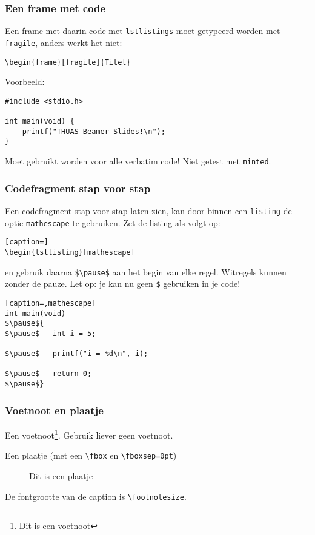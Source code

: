 \documentclass[fleqn,aspectratio=169,dutch,10pt]{beamer}
\begin{document}
\begin{frame}[fragile]
\frametitle{Een frame met code}
Een frame met daarin code met \texttt{lstlistings} moet getypeerd worden met \texttt{fragile}, anders werkt het niet:

\begin{lstlisting}
\begin{frame}[fragile]{Titel}
\end{lstlisting}

Voorbeeld:

\begin{lstlisting}
#include <stdio.h>

int main(void) {
    printf("THUAS Beamer Slides!\n");
}
\end{lstlisting}

Moet gebruikt worden voor alle verbatim code! Niet getest met \lstinline|minted|.
\end{frame}


\begin{frame}[fragile]
\frametitle{Codefragment stap voor stap}
Een codefragment stap voor stap laten zien, kan door binnen een \lstinline|listing| de optie \lstinline|mathescape| te gebruiken. Zet de listing als volgt op:
\begin{lstlisting}[caption=]
\begin{lstlisting}[mathescape]
\end{lstlisting}
en gebruik daarna \lstinline|$\pause$| aan het begin van elke regel. Witregels kunnen zonder de pauze. Let op: je kan nu geen \lstinline|$| gebruiken in je code!
\begin{lstlisting}[caption=,mathescape]
int main(void)
$\pause${
$\pause$   int i = 5;

$\pause$   printf("i = %d\n", i);

$\pause$   return 0;
$\pause$}
\end{lstlisting}
\end{frame}


\begin{frame}[fragile]
\frametitle{Voetnoot en plaatje}
Een voetnoot\footnote{Dit is een voetnoot}. Gebruik liever geen voetnoot.

Een plaatje (met een \lstinline|\fbox| en \lstinline|\fboxsep=0pt|)

\begin{figure}
\fboxsep=0pt
\fbox{\resizebox{0.30\paperwidth}{!}{\beamerthemethuaslogo}}
\caption{Dit is een plaatje}
\end{figure}

De fontgrootte van de caption is \lstinline|\footnotesize|.

\end{frame}
\end{document}
